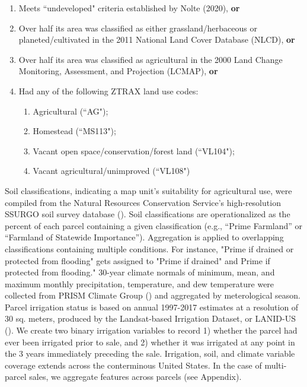 \documentclass[12pt]{article}
\begin{document}
\begin{enumerate}
    \item Meets ``undeveloped" criteria established by Nolte (2020), \textbf{or}
    \item Over half its area was classified as either grassland/herbaceous or planeted/cultivated in the 2011 National Land Cover Database (NLCD), \textbf{or}
    \item Over half its area was classified as agricultural in the 2000 Land Change Monitoring, Assessment, and Projection (LCMAP), \textbf{or}
    \item Had any of the following ZTRAX land use codes:
    \begin{enumerate}
        \item Agricultural (``AG");
        \item Homestead (``MS113");
        \item Vacant open space/conservation/forest land (``VL104");
        \item Vacant agricultural/unimproved (``VL108")
    \end{enumerate}
\end{enumerate}


Soil classifications, indicating a map unit's suitability for agricultural use, were compiled from the Natural Resources Conservation Service’s high-resolution SSURGO soil survey database (\cite{SoilSurveyStaffSoilStates}). Soil classifications are operationalized as the percent of each parcel containing a given classification (e.g., “Prime Farmland” or “Farmland of Statewide Importance”). Aggregation is applied to overlapping classifications containing multiple conditions. For instance, "Prime if drained or protected from flooding" gets assigned to "Prime if drained" and Prime if protected from flooding." 30-year climate normals of minimum, mean, and maximum monthly precipitation, temperature, and dew temperature were collected from PRISM Climate Group (\cite{PRISMClimate2021}) and aggregated by meterological season. Parcel irrigation status is based on annual 1997-2017 estimates at a resolution of 30 sq. meters, produced by the Landsat-based Irrigation Dataset, or LANID-US (\cite{Xie2021MappingStates}). We create two binary irrigation variables to record 1) whether the parcel had ever been irrigated prior to sale, and 2) whether it was irrigated at any point in the 3 years immediately preceding the sale. Irrigation, soil, and climate variable coverage extends across the conterminous United States. In the case of multi-parcel sales, we aggregate features across parcels (see Appendix).
\end{document}
